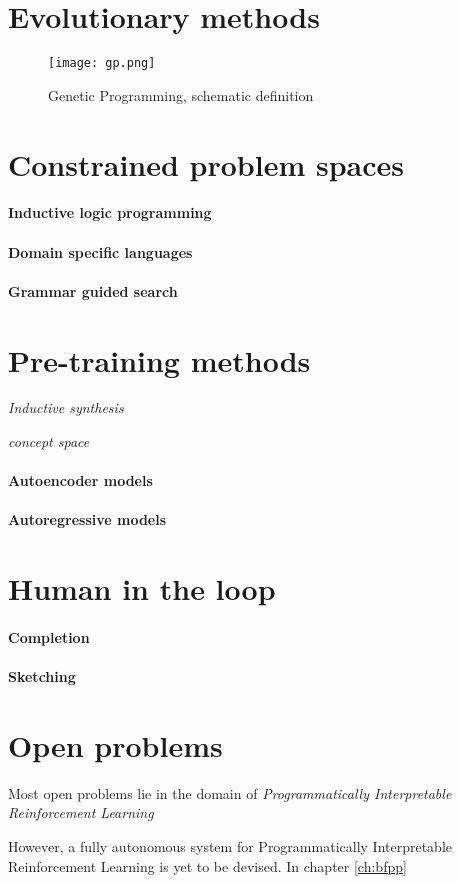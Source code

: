\newpage
\section{Evolutionary methods}

\begin{figure}[H]
    \centering
    \texttt{[image: gp.png]}
    \caption{Genetic Programming, schematic definition}
    \label{fig:gp}
\end{figure}

\newpage
\section{Constrained problem spaces}

\paragraph{Inductive logic programming}

\paragraph{Domain specific languages}

\paragraph{Grammar guided search}

\section{Pre-training methods}

\emph{Inductive synthesis}

\emph{concept space}

\paragraph{Autoencoder models}

\paragraph{Autoregressive models}

\section{Human in the loop}

\paragraph{Completion}

\paragraph{Sketching}

\section{Open problems}

Most open problems lie in the domain of \emph{Programmatically Interpretable Reinforcement Learning}

However, a fully autonomous system for Programmatically Interpretable Reinforcement Learning is yet to be devised. In chapter \ref{ch:bfpp}